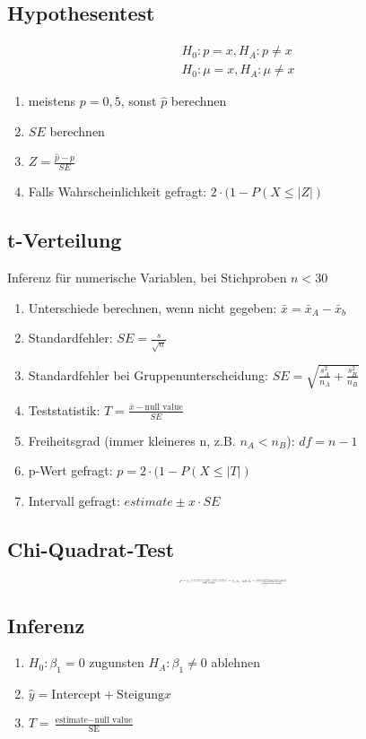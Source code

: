 \documentclass[10pt,a4paper,landscape]{article}
\begin{document}
\begin{multicols}{4}
\subsection{Hypothesentest}
\begin{align*}
& H_0 : p = x, H_A: p \neq x \\
& H_0 : \mu = x, H_A: \mu \neq x
\end{align*}

\begin{enumerate}
\item meistens $p=0,5$, sonst $\hat{p}$ berechnen
\item $SE$ berechnen
\item $Z=\frac{\hat{p}-p}{SE}$
\item Falls Wahrscheinlichkeit gefragt: $2 \cdot (1-P(X \leq |Z|)$
\end{enumerate}

\subsection{t-Verteilung}
Inferenz für numerische Variablen, bei Stichproben $n < 30$

\begin{enumerate}
\item Unterschiede berechnen, wenn nicht gegeben: $\bar{x} = \bar{x}_A - \bar{x}_b$
\item Standardfehler: $SE = \frac{s}{\sqrt{n}}$
\item Standardfehler bei Gruppenunterscheidung: $SE = \sqrt{\frac{s_A^2}{n_A} + \frac{s_B^2}{n_B}}$
\item Teststatistik: $T = \frac{\bar{x} - \text{null value}}{SE}$
\item Freiheitsgrad (immer kleineres n, z.B. $n_A < n_B$): $df = n - 1$
\item p-Wert gefragt: $p=2 \cdot (1-P(X \leq |T|)$
\item Intervall gefragt: $estimate \pm x \cdot SE$
\end{enumerate}

\subsection{Chi-Quadrat-Test}
\[\resizebox{0.25\textwidth}{!}{$
\chi^2 = \sum \frac{(\text{observed count}_i-\text{null count}_i)^2}{\text{null count}_i} = \sum Z_i, ~\text{mit } Z_i = \frac{\text{observed} - \text{expected counts}}{\sqrt{\text{expected counts}}}
$}
\]

\subsection{Inferenz}
\begin{enumerate}
\item $H_0: \beta_1=0$ zugunsten $H_A: \beta_1 \neq 0$ ablehnen
\item $\hat{y}= \text{Intercept} + \text{Steigung}x$
\item $T = \frac{\text{estimate} - \text{null value}}{\text{SE}}$
\end{enumerate}


\end{multicols}
\end{document}
